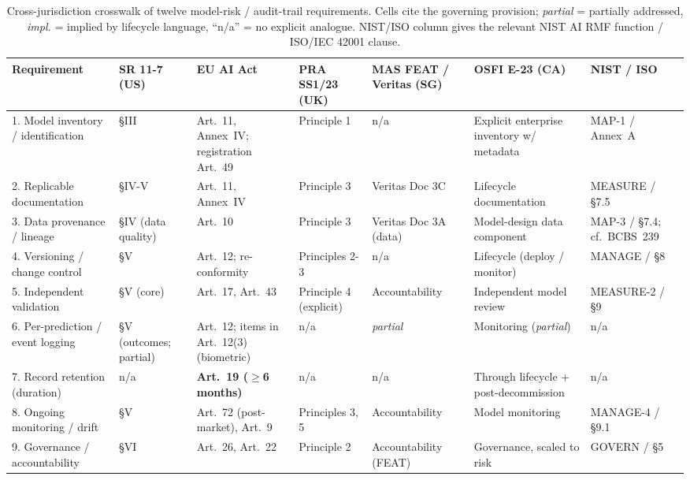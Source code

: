 \begin{landscape}
\begin{table}[p]
\centering
\scriptsize
\setlength{\tabcolsep}{4pt}
\renewcommand{\arraystretch}{1.25}
\caption{Cross-jurisdiction crosswalk of twelve model-risk / audit-trail requirements. Cells cite the governing provision; \textit{partial} = partially addressed, \textit{impl.} = implied by lifecycle language, ``n/a'' = no explicit analogue. NIST/ISO column gives the relevant NIST AI RMF function / ISO/IEC 42001 clause.}\label{tab:crosswalk}
\begin{tabular}{@{}p{3.0cm}p{2.6cm}p{3.0cm}p{2.4cm}p{2.6cm}p{2.4cm}p{2.6cm}@{}}
\toprule
\textbf{Requirement} & \textbf{SR 11-7 (US)} & \textbf{EU AI Act} & \textbf{PRA SS1/23 (UK)} & \textbf{MAS FEAT / Veritas (SG)} & \textbf{OSFI E-23 (CA)} & \textbf{NIST / ISO} \\
\midrule
1. Model inventory / identification & \S III & Art.~11, Annex~IV; registration Art.~49 & Principle 1 & n/a & Explicit enterprise inventory w/ metadata & MAP-1 / Annex~A \\
2. Replicable documentation & \S IV-V & Art.~11, Annex~IV & Principle 3 & Veritas Doc 3C & Lifecycle documentation & MEASURE / \S 7.5 \\
3. Data provenance / lineage & \S IV (data quality) & Art.~10 & Principle 3 & Veritas Doc 3A (data) & Model-design data component & MAP-3 / \S 7.4; cf.\ BCBS~239 \\
4. Versioning / change control & \S V & Art.~12; re-conformity & Principles 2-3 & n/a & Lifecycle (deploy / monitor) & MANAGE / \S 8 \\
5. Independent validation & \S V (core) & Art.~17, Art.~43 & Principle 4 (explicit) & Accountability & Independent model review & MEASURE-2 / \S 9 \\
6. Per-prediction / event logging & \S V (outcomes; partial) & Art.~12; items in Art.~12(3) (biometric) & n/a & \textit{partial} & Monitoring (\textit{partial}) & n/a \\
7. Record retention (duration) & n/a & \textbf{Art.~19 ($\geq$6 months)} & n/a & n/a & Through lifecycle + post-decommission & n/a \\
8. Ongoing monitoring / drift & \S V & Art.~72 (post-market), Art.~9 & Principles 3, 5 & Accountability & Model monitoring & MANAGE-4 / \S 9.1 \\
9. Governance / accountability & \S VI & Art.~26, Art.~22 & Principle 2 & Accountability (FEAT) & Governance, scaled to risk & GOVERN / \S 5 \\

\end{tabular}
\end{table}
\end{landscape}
